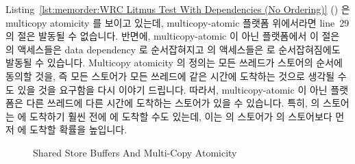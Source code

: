 Listing~\ref{lst:memorder:WRC Litmus Test With Dependencies (No Ordering)}
()
은 multicopy atomicity 를 보이고 있는데, multicopy-atomic 플랫폼 위에서라면
line~29 의  절은 발동될 수 없습니다.
반면에, multicopy-atomic 이 아닌 플랫폼에서 이  절은  의
액세스들은 data dependency 로 순서잡혀지고  의 액세스들은
 로 순서잡혀짐에도 발동될 수 있습니다.
Multicopy atomicity 의 정의는 모든 쓰레드가 스토어의 순서에 동의할 것을, 즉
모든 스토어가 모든 쓰레드에 같은 시간에 도착하는 것으로 생각될 수도 있을 것을
요구함을 다시 이야기 드립니다.
따라서, multicopy-atomic 이 아닌 플랫폼은 다른 쓰레드에 다른 시간에 도착하는
스토어가 있을 수 있습니다.
특히,  의 스토어는  에 도착하기 훨씬 전에  에 도착할
수도 있는데, 이는  의 스토어가  의 스토어보다 먼저 
에 도착할 확률을 높입니다.

\begin{figure}[tb]
\centering
{}
\caption{Shared Store Buffers And Multi-Copy Atomicity}
\label{fig:memorder:Shared Store Buffers And Multi-Copy Atomicity}
\end{figure}

